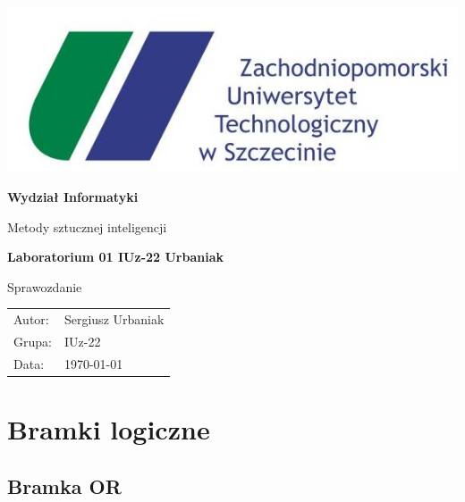 \documentclass[pointlessnumbers, abstracton, headsepline, a4paper]{scrartcl}
\let\myTOC\tableofcontents
\renewcommand\tableofcontents{\myTOC\clearpage\pagenumbering{arabic}}
\begin{document}
\begin{titlepage}

\begin{center}
\includegraphics[scale=0.5]{logos/zut.jpg}
\par
\end{center}

\begin{center}
\textsf{\textbf{\LARGE Wydział Informatyki}}
\end{center}{\LARGE}

\vspace{1.5cm}

\begin{center}
\textsf{\Large Metody sztucznej inteligencji}
\end{center}

\begin{center}
\textsf{\textbf{\Large Laboratorium 01 IUz-22 Urbaniak}}
\end{center}

\begin{center}
\textsf{\large Sprawozdanie}
\end{center}

\vspace{3.5cm}

\begin{center}
\begin{tabular}{ll}
Autor: & Sergiusz Urbaniak\tabularnewline
Grupa: & IUz-22\tabularnewline
Data: & \today\tabularnewline
\end{tabular}
\end{center}

\end{titlepage}

\tableofcontents

\section{Bramki logiczne}
\subsection{Bramka OR}
\end{document}
